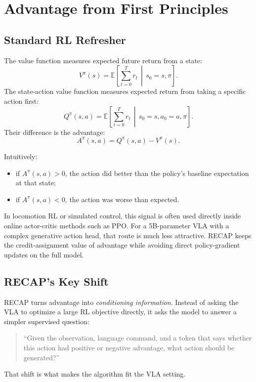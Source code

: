 \documentclass[11pt]{article}
\begin{document}
\section{Advantage from First Principles}

\subsection{Standard RL Refresher}

The value function measures expected future return from a state:
\[
V^{\pi}(s) = \mathbb{E}\!\left[\sum_{t=0}^{T} r_t \,\middle|\, s_0 = s, \pi \right].
\]
The state-action value function measures expected return from taking a specific action first:
\[
Q^{\pi}(s, a) = \mathbb{E}\!\left[\sum_{t=0}^{T} r_t \,\middle|\, s_0 = s, a_0 = a, \pi \right].
\]
Their difference is the advantage:
\[
A^{\pi}(s, a) = Q^{\pi}(s, a) - V^{\pi}(s).
\]

Intuitively:
\begin{itemize}[leftmargin=1.5em]
  \item if \(A^{\pi}(s, a) > 0\), the action did better than the policy's baseline expectation at that state;
  \item if \(A^{\pi}(s, a) < 0\), the action was worse than expected.
\end{itemize}

In locomotion RL or simulated control, this signal is often used directly inside online actor-critic methods such as PPO. For a 5B-parameter VLA with a complex generative action head, that route is much less attractive. RECAP keeps the credit-assignment value of advantage while avoiding direct policy-gradient updates on the full model.

\subsection{RECAP's Key Shift}

RECAP turns advantage into \emph{conditioning information}. Instead of asking the VLA to optimize a large RL objective directly, it asks the model to answer a simpler supervised question:

\begin{quote}
``Given the observation, language command, and a token that says whether this action had positive or negative advantage, what action should be generated?''
\end{quote}

That shift is what makes the algorithm fit the VLA setting.
\end{document}
